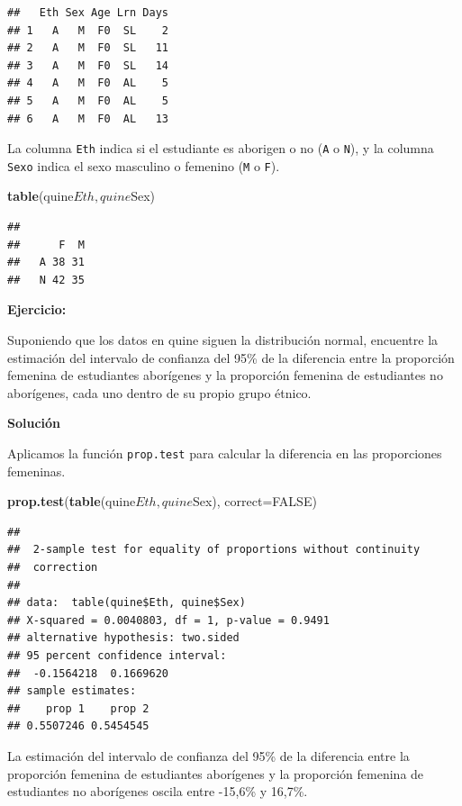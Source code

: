 \documentclass[]{article}
\newenvironment{Shaded}{\begin{snugshade}}{\end{snugshade}}
\newcommand{\KeywordTok}[1]{\textcolor[rgb]{0.13,0.29,0.53}{\textbf{{#1}}}}
\newcommand{\DataTypeTok}[1]{\textcolor[rgb]{0.13,0.29,0.53}{{#1}}}
\newcommand{\OtherTok}[1]{\textcolor[rgb]{0.56,0.35,0.01}{{#1}}}
\newcommand{\NormalTok}[1]{{#1}}
\numberwithin{equation}{section}
\begin{document}
\begin{verbatim}
##   Eth Sex Age Lrn Days
## 1   A   M  F0  SL    2
## 2   A   M  F0  SL   11
## 3   A   M  F0  SL   14
## 4   A   M  F0  AL    5
## 5   A   M  F0  AL    5
## 6   A   M  F0  AL   13
\end{verbatim}

La columna \texttt{Eth} indica si el estudiante es aborigen o no
(\texttt{A} o \texttt{N}), y la columna \texttt{Sexo} indica el sexo
masculino o femenino (\texttt{M} o \texttt{F}).

\begin{Shaded}
\begin{Highlighting}[]
\KeywordTok{table}\NormalTok{(quine$Eth,quine$Sex)}
\end{Highlighting}
\end{Shaded}

\begin{verbatim}
##    
##      F  M
##   A 38 31
##   N 42 35
\end{verbatim}

\textbf{Ejercicio:}

Suponiendo que los datos en quine siguen la distribución normal,
encuentre la estimación del intervalo de confianza del 95\% de la
diferencia entre la proporción femenina de estudiantes aborígenes y la
proporción femenina de estudiantes no aborígenes, cada uno dentro de su
propio grupo étnico.

\textbf{Solución}

Aplicamos la función \texttt{prop.test} para calcular la diferencia en
las proporciones femeninas.

\begin{Shaded}
\begin{Highlighting}[]
\KeywordTok{prop.test}\NormalTok{(}\KeywordTok{table}\NormalTok{(quine$Eth, quine$Sex), }\DataTypeTok{correct=}\OtherTok{FALSE}\NormalTok{) }
\end{Highlighting}
\end{Shaded}

\begin{verbatim}
## 
##  2-sample test for equality of proportions without continuity
##  correction
## 
## data:  table(quine$Eth, quine$Sex)
## X-squared = 0.0040803, df = 1, p-value = 0.9491
## alternative hypothesis: two.sided
## 95 percent confidence interval:
##  -0.1564218  0.1669620
## sample estimates:
##    prop 1    prop 2 
## 0.5507246 0.5454545
\end{verbatim}

La estimación del intervalo de confianza del 95\% de la diferencia entre
la proporción femenina de estudiantes aborígenes y la proporción
femenina de estudiantes no aborígenes oscila entre -15,6\% y 16,7\%.
\end{document}
